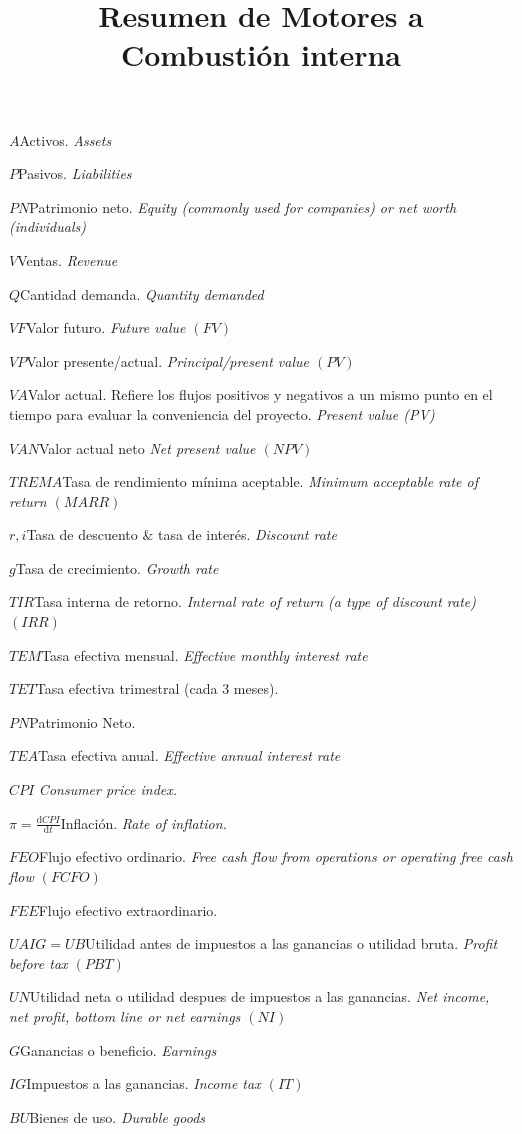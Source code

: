 \documentclass[twocolumn,10pt]{article}
\newcommand{\glossml}[3]{$#1$\indent #2 \emph{#3}  \par \vspace{.4cm} } %
\newcommand{\di}{\textrm{d}}
\begin{document}
\title{Resumen de Motores a Combustión interna}

\glossml{A}{Activos.}{Assets}
\glossml{P}{Pasivos.}{Liabilities}

\glossml{PN}{Patrimonio neto.}{Equity (commonly used for companies) or net worth (individuals)}

\glossml{V}{Ventas.}{Revenue}

\glossml{Q}{Cantidad demanda.}{Quantity demanded}

\glossml{VF}{Valor futuro.}{Future value $(FV)$}
\glossml{VP}{Valor presente/actual.}{Principal/present value $(PV)$}
\glossml{VA}{Valor actual. Refiere los flujos positivos y negativos a un mismo punto en el tiempo para evaluar la conveniencia del proyecto.}{Present value (PV)}

\glossml{VAN}{Valor actual neto}{Net present value $(NPV)$}

\glossml{TREMA}{Tasa de rendimiento mínima aceptable.}{Minimum acceptable rate of return $(MARR)$}

\glossml{r,i}{Tasa de descuento \& tasa de interés.}{Discount rate}



\glossml{g}{Tasa de crecimiento.}{Growth rate}

\glossml{TIR}{Tasa interna de retorno.}{Internal rate of return (a type of discount rate) $(IRR)$}

\glossml{TEM}{Tasa efectiva mensual.}{Effective monthly interest rate}

\glossml{TET}{Tasa efectiva trimestral (cada 3 meses).}{}
\glossml{PN}{Patrimonio Neto.}{}
\glossml{TEA}{Tasa efectiva anual.}{Effective annual interest rate}
\glossml{CPI}{}{Consumer price index.}
\glossml{\pi=\frac{\di CPI}{\di t}}{Inflación.}{Rate of inflation.}
\glossml{FEO}{Flujo efectivo ordinario.}{Free cash flow from operations or operating free cash flow $(FCFO)$}
\glossml{FEE}{Flujo efectivo extraordinario.}{}
\glossml{UAIG=UB}{Utilidad antes de impuestos a las ganancias o utilidad bruta.}{Profit before tax $(PBT)$}
\glossml{UN}{Utilidad neta o utilidad despues de impuestos a las ganancias.}{Net income, net profit, bottom line or net earnings $(NI)$}
\glossml{G}{Ganancias o beneficio.}{Earnings}
\glossml{IG}{Impuestos a las ganancias.}{Income tax $(IT)$}
\glossml{BU}{Bienes de uso.}{Durable goods}
\end{document}
